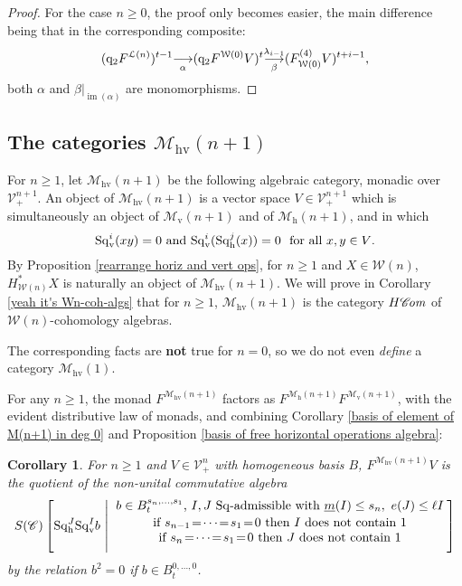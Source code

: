 \documentclass[11pt]{amsart} \renewcommand{\baselinestretch}{1.2}
\theoremstyle{plain}
\newtheorem{cor}[thm]{Corollary}
\numberwithin{equation}{section} %
\theoremstyle{plain}
\newtheorem{cor}[thm]{Corollary}
\numberwithin{equation}{chapter} %
\DeclareMathOperator{\im}{im}
\renewcommand{\to}{\longrightarrow}
\newcommand{\scrC}{\mathscr{C}}
\newcommand{\calV}{\mathcal{V}}
\newcommand{\calw}{\mathcal{W}}
\newcommand{\call}{\mathcal{L}}
\newcommand{\calMv}{\mathcal{M}\dver}
\newcommand{\calMh}{\mathcal{M}\dhor}
\newcommand{\calMhv}{\mathcal{M}_\mathrm{hv}}
\newcommand{\CommOperad}{{\scrC}}
\newcommand{\vect}[2]{\calV^{#1}_{#2}}
\newcommand{\HA}[1]{H#1}
\newcommand{\quadgrad}[1]{\mathrm{q}_{#1}}
\newcommand{\mono}{{\to}}
\newcommand{\minDimSq}{\underline{m}}
\newcommand{\excess}{e}
\newcommand{\Sq}{\mathrm{Sq}}
\newcommand{\algs}{{\scrC\!\textit{\normalfont\textit{om}}}}
\newcommand{\uver}{^\mathrm{v}}
\newcommand{\dver}{_\mathrm{v}}
\newcommand{\dhor}{_\mathrm{h}}
\newcommand{\Sqh}{\mathrm{Sq}\dhor}
\newcommand{\Sqv}{\mathrm{Sq}\dver}
\newcommand{\deltav}{\delta\uver}
\newcommand{\SubsectionOrSection}[1]{\subsection{#1}}
\begin{document}
\begin{Cohomology Operations for W and U}
\begin{proof}
For the case $n\geq0$, the proof only becomes easier, the main difference being that in the corresponding composite:
\[(\quadgrad{2}F^{\call(n)})^{t-1}\underset{\smash{\alpha}}{{\to}} (\quadgrad{2}F^{\calw(0)}V)^{t}\underset{\smash{\beta}}{\overset{\lambda_{i-1}}{\mono}} (F^{(4)}_{\calw(0)}V)^{t+i-1},\]
both $\alpha$ and $\beta|_{\im(\alpha)}$ are monomorphisms.
\end{proof}

\SubsectionOrSection{The categories $\calMhv(n+1)$}
For $n\geq1$, let $\calMhv(n+1)$ be the following algebraic category, monadic over $\vect{n+1}{+}$. An object of $\calMhv(n+1)$ is a vector space $V\in \vect{n+1}{+}$ which is simultaneously an object of $\calMv(n+1)$ and of $\calMh(n+1)$, and in which
\[\Sqv^i(xy)=0\textup{ and }\Sqv^i(\Sqh^j(x))=0\textup{\ \ for all $x,y\in V$}.\]
By Proposition \ref{rearrange horiz and vert ops}, for $n\geq1$ and $X\in\calw(n)$, $H^*_{\calw(n)}X$ is naturally an object of $\calMhv(n+1)$.  We will prove in Corollary \ref{yeah it's Wn-coh-algs} that for $n\geq1$, $\calMhv(n+1)$ is the category $\HA{\algs}$ of $\calw(n)$-cohomology algebras.

The corresponding facts are \textbf{not} true for $n=0$, so we do not even \emph{define} a category $\calMhv(1)$.

For any $n\geq1$, the monad $F^{\calMhv(n+1)}$ factors as $F^{\calMh(n+1)}F^{\calMv(n+1)}$, with the evident distributive law of monads, and combining Corollary \ref{basis of element of M(n+1) in deg 0} and Proposition \ref{basis of free horizontal operations algebra}:
\begin{cor}
\label{calMhv(n+1) description}
For $n\geq1$ and $V\in\vect{n}{+}$ with homogeneous basis $B$,  $F^{\calMhv(n+1)}V$ is the quotient of the non-unital commutative algebra
%
%
%
\[S(\CommOperad) \left[\Sqh^J\Sq\dver^Ib\ \middle|\ \genfrac{}{}{0pt}{}{{\displaystyle\genfrac{}{}{0pt}{}{b\in B^{s_{n},\ldots,s_1}_t\textup{, $I,J$ $\Sq$-admissible with }\minDimSq(I)\leq s_n,\ \excess(J)\leq \ell I}{\textup{if }s_{n-1}\!=\!\cdots\!=\!s_1\!=\!0\textup{ then $I$ does not contain 1}}}}{
\textup{if }s_{n}\!=\!\cdots\!=\!s_1\!=\!0\textup{ then $J$ does not contain 1}
}
\right]\]
by the relation $b^2=0$ if $b\in B_t^{0,\ldots,0}$.
\end{cor}



\end{Cohomology Operations for W and U}
\end{document}
